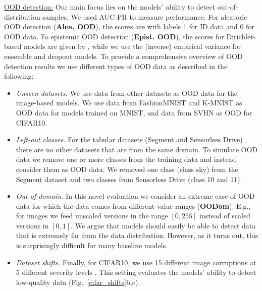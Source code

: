 \underline{OOD detection:} Our main focus lies on the models' ability to detect out-of-distribution samples. We used AUC-PR to measure performance. For aleatoric OOD detection (\textbf{Alea. OOD}), the scores are  with labels 1 for ID data and 0 for OOD data. Fo epistemic OOD detection (\textbf{Epist. OOD}), the scores for Dirichlet-based models are given by \smash{$\alpha_0\dataix = \sum_\iclass \alpha_\iclass\dataix$}, while we use the (inverse) empirical variance  for ensemble and dropout models. To provide a comprehensive overview of OOD detection results we use different types of OOD data as described in the following: 
\begin{itemize}
    \item \textit{Unseen datasets.} We use data from other datasets as OOD data for the image-based models. We use data from FashionMNIST \cite{fashionmnist} and K-MNIST \cite{kmnist}  as OOD data for models trained on MNIST, and data from SVHN \cite{svhn} as OOD for CIFAR10.
    \item \textit{Left-out classes.} For the tabular datasets (Segment and Sensorless Drive) there are no other datasets that are from the same domain. To simulate OOD data we remove one or more classes from the training data and instead consider them as OOD data. We removed one class (class sky) from the Segment dataset and two classes from Sensorless Drive (class 10 and 11).
    \item \textit{Out-of-domain.} In this novel evaluation we consider an extreme case of OOD data for which the data comes from different value ranges (\textbf{OODom}). E.g., for images we feed unscaled versions in the range $[0, 255]$ instead of scaled versions in $[0,1]$. We argue that models should easily be able to detect data that is extremely far from the data distribution. However, as it turns out, this is surprisingly difficult for many baseline models.
    \item \textit{Dataset shifts.} Finally, for CIFAR10, we use 15 different image corruptions at 5 different severity levels \cite{benchmarking_corruptions}. This setting evaluates the models' ability to detect low-quality data (Fig.~\ref{cifar_shifts}b,c). 
\end{itemize}

